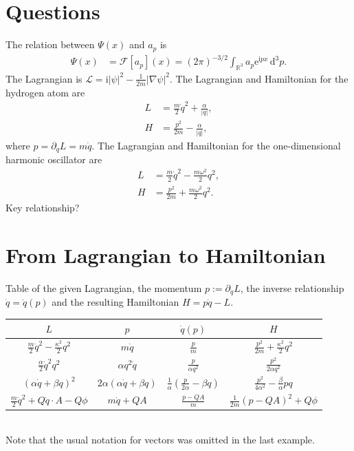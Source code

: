 \documentclass[english, parskip=full]{scrartcl}
\title{\titel}
\author{\autor}
\date{\today}
\newcommand{\intr}{}
\def\I{\text{i}}
\def\e{\text{e}}
\begin{document}
\maketitle  %

\section{Questions}
The relation between $\Psi(x)$ and $a_p$ is
\begin{align}
\Psi(x)&=\mathcal{F}[a_p](x)=(2\pi)^{-3/2}\intr\int_{\mathbb{R}^{3}}{a_p\e^{\I px}}\,\mathrm{d}^{3}p.
\end{align}
The Lagrangian is $\mathcal{L}=\I|\psi|^2-\frac{1}{2m}|\nabla\psi|^2$.
The Lagrangian and Hamiltonian for the hydrogen atom are
\begin{align}
L&=\frac{m}{2}\dot{q}^2+\frac{\alpha}{|q|},\\
H&=\frac{p^2}{2m}-\frac{\alpha}{|q|},
\end{align}
where $p=\partial_{\dot{q}}L=m\dot{q}$.
The Lagrangian and Hamiltonian for the one-dimensional harmonic oscillator are
\begin{align}
L&=\frac{m}{2}\dot{q}^2-\frac{m\omega^2}{2}q^2,\\
H&=\frac{p^2}{2m}+\frac{m\omega^2}{2}q^2.
\end{align}
Key relationship?\newpage
\section{From Lagrangian to Hamiltonian}
Table of the given Lagrangian, the momentum $p:=\partial_{\dot{q}} L$, the inverse relationship $\dot{q}=\dot{q}(p)$ and the resulting Hamiltonian $H=p\dot{q}-L$.
\begin{table}[h!]
\centering
\begin{tabular}{c|c|c|c}
$L$&$p$&$\dot{q}(p)$&$H$\\ \hline
$\frac{m}{2}\dot{q}^2-\frac{\kappa^2}{2}q^2$&$m\dot{q} $&$\frac{p}{m}$&$\frac{p^2}{2m}+\frac{\kappa^2}{2}q^2$\\ \hline
$\frac{\alpha}{2}\dot{q}^2q^2$&$\alpha q^2\dot{q} $&$\frac{p}{\alpha q^2}$&$\frac{p^2}{2\alpha q^2}$\\ \hline
$\left( \alpha\dot{q}+\beta q \right)^2$&$2\alpha\left( \alpha\dot{q}+\beta q \right)$&$\frac{1}{\alpha}\left( \frac{p}{2\alpha}-\beta q \right)$&$\frac{p^2}{4\alpha^2}-\frac{\beta}{\alpha}pq$\\ \hline
$\frac{m}{2}\dot{q}^2+Q\dot{q}\cdot A-Q\phi$&$m\dot{q} +QA$&$\frac{p-QA}{m}$&$\frac{1}{2m}(p-QA)^2+Q\phi$\\ 
\end{tabular}
\end{table}\\
Note that the usual notation for vectors was omitted in the last example.\newpage
\end{document}

